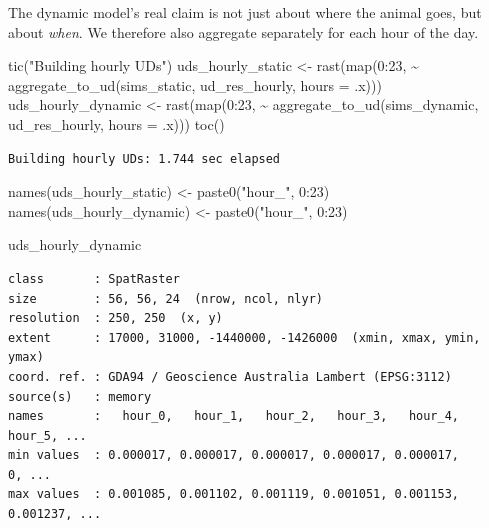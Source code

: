 \documentclass[
  letterpaper,
  DIV=11,
  numbers=noendperiod]{scrartcl}
\newenvironment{Shaded}{\begin{snugshade}}{\end{snugshade}}
\newcommand{\AttributeTok}[1]{\textcolor[rgb]{0.40,0.45,0.13}{#1}}
\newcommand{\DecValTok}[1]{\textcolor[rgb]{0.68,0.00,0.00}{#1}}
\newcommand{\FunctionTok}[1]{\textcolor[rgb]{0.28,0.35,0.67}{#1}}
\newcommand{\NormalTok}[1]{\textcolor[rgb]{0.00,0.23,0.31}{#1}}
\newcommand{\OtherTok}[1]{\textcolor[rgb]{0.00,0.23,0.31}{#1}}
\newcommand{\SpecialCharTok}[1]{\textcolor[rgb]{0.37,0.37,0.37}{#1}}
\newcommand{\StringTok}[1]{\textcolor[rgb]{0.13,0.47,0.30}{#1}}
\begin{document}
The dynamic model's real claim is not just about where the animal goes,
but about \emph{when}. We therefore also aggregate separately for each
hour of the day.

\begin{Shaded}
\begin{Highlighting}[]
\FunctionTok{tic}\NormalTok{(}\StringTok{"Building hourly UDs"}\NormalTok{)}
\NormalTok{uds\_hourly\_static  }\OtherTok{\textless{}{-}} \FunctionTok{rast}\NormalTok{(}\FunctionTok{map}\NormalTok{(}\DecValTok{0}\SpecialCharTok{:}\DecValTok{23}\NormalTok{, }\SpecialCharTok{\textasciitilde{}} \FunctionTok{aggregate\_to\_ud}\NormalTok{(sims\_static,  ud\_res\_hourly, }\AttributeTok{hours =}\NormalTok{ .x)))}
\NormalTok{uds\_hourly\_dynamic }\OtherTok{\textless{}{-}} \FunctionTok{rast}\NormalTok{(}\FunctionTok{map}\NormalTok{(}\DecValTok{0}\SpecialCharTok{:}\DecValTok{23}\NormalTok{, }\SpecialCharTok{\textasciitilde{}} \FunctionTok{aggregate\_to\_ud}\NormalTok{(sims\_dynamic, ud\_res\_hourly, }\AttributeTok{hours =}\NormalTok{ .x)))}
\FunctionTok{toc}\NormalTok{()}
\end{Highlighting}
\end{Shaded}

\begin{verbatim}
Building hourly UDs: 1.744 sec elapsed
\end{verbatim}

\begin{Shaded}
\begin{Highlighting}[]
\FunctionTok{names}\NormalTok{(uds\_hourly\_static)  }\OtherTok{\textless{}{-}} \FunctionTok{paste0}\NormalTok{(}\StringTok{"hour\_"}\NormalTok{, }\DecValTok{0}\SpecialCharTok{:}\DecValTok{23}\NormalTok{)}
\FunctionTok{names}\NormalTok{(uds\_hourly\_dynamic) }\OtherTok{\textless{}{-}} \FunctionTok{paste0}\NormalTok{(}\StringTok{"hour\_"}\NormalTok{, }\DecValTok{0}\SpecialCharTok{:}\DecValTok{23}\NormalTok{)}

\NormalTok{uds\_hourly\_dynamic}
\end{Highlighting}
\end{Shaded}

\begin{verbatim}
class       : SpatRaster
size        : 56, 56, 24  (nrow, ncol, nlyr)
resolution  : 250, 250  (x, y)
extent      : 17000, 31000, -1440000, -1426000  (xmin, xmax, ymin, ymax)
coord. ref. : GDA94 / Geoscience Australia Lambert (EPSG:3112)
source(s)   : memory
names       :   hour_0,   hour_1,   hour_2,   hour_3,   hour_4,   hour_5, ...
min values  : 0.000017, 0.000017, 0.000017, 0.000017, 0.000017,        0, ...
max values  : 0.001085, 0.001102, 0.001119, 0.001051, 0.001153, 0.001237, ...
\end{verbatim}
\end{document}

